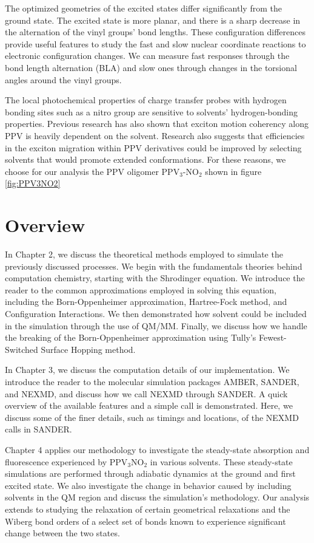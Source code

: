 The optimized geometries of the excited states differ significantly from the ground state.
The excited state is more planar, and there is a sharp decrease in the alternation of the vinyl groups' bond lengths.
These configuration differences provide useful features to study the fast and slow nuclear coordinate reactions to electronic configuration changes. We can measure fast responses through the bond length alternation (BLA) and slow ones through changes in the torsional angles around the vinyl groups.

The local photochemical properties of charge transfer probes with hydrogen bonding sites such as a nitro group are sensitive to solvents' hydrogen-bonding properties.  \cite{marini2010solvatochromism}
Previous research has also shown that exciton motion coherency along PPV is heavily dependent on the solvent. \cite{collini2009coherent}
Research also suggests that efficiencies in the exciton migration within PPV derivatives could be improved by selecting solvents that would promote extended conformations.\cite{bredas2009excitons}
For these reasons, we choose for our analysis the PPV oligomer PPV\(_3\)-NO\(_2\) shown in figure \ref{fig:PPV3NO2}

\section{Overview}
In Chapter 2, we discuss the theoretical methods employed to simulate the previously discussed processes.
We begin with the fundamentals theories behind computation chemistry, starting with the Shrodinger equation.
We introduce the reader to the common approximations employed in solving this equation, including the Born-Oppenheimer approximation, Hartree-Fock method, and Configuration Interactions.
We then demonstrated how solvent could be included in the simulation through the use of QM/MM.
Finally, we discuss how we handle the breaking of the Born-Oppenheimer approximation using Tully's Fewest-Switched Surface Hopping method.

In Chapter 3, we discuss the computation details of our implementation.
We introduce the reader to the molecular simulation packages AMBER, SANDER, and NEXMD, and discuss how we call NEXMD through SANDER.
A quick overview of the available features and a simple call is demonstrated. Here, we discuss some of the finer details, such as timings and locations, of the NEXMD calls in SANDER.

Chapter 4 applies our methodology to investigate the steady-state absorption and fluorescence experienced by PPV\(_3\)NO\(_2\) in various solvents.
These steady-state simulations are performed through adiabatic dynamics at the ground and first excited state.
We also investigate the change in behavior caused by including solvents in the QM region and discuss the simulation's methodology.
Our analysis extends to studying the relaxation of certain geometrical relaxations and the Wiberg bond orders of a select set of bonds known to experience significant change between the two states.

